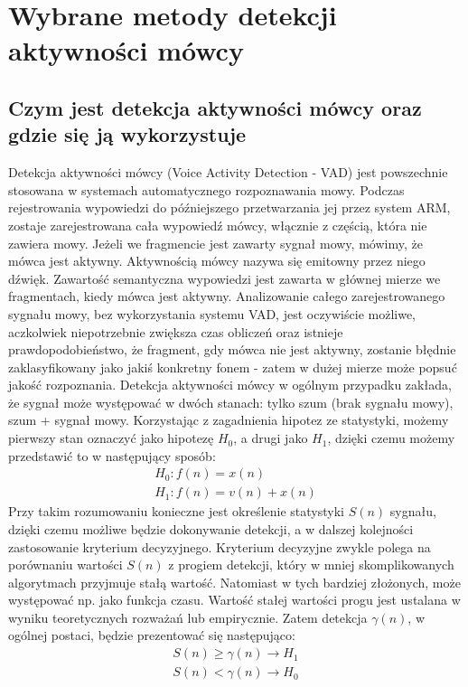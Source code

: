 \documentclass[eng,printmode]{mgr}
\begin{document}
 
\chapter{Wybrane metody detekcji aktywności mówcy}
 \section{Czym jest detekcja aktywności mówcy oraz gdzie się ją wykorzystuje}
 
 Detekcja aktywności mówcy (Voice Activity Detection - VAD) jest powszechnie stosowana w systemach automatycznego rozpoznawania mowy. Podczas rejestrowania wypowiedzi do późniejszego przetwarzania jej przez system ARM, zostaje zarejestrowana cała wypowiedź mówcy, włącznie z częścią, która nie zawiera mowy. Jeżeli we fragmencie jest zawarty sygnał mowy, mówimy, że mówca jest aktywny. Aktywnością mówcy nazywa się emitowny przez niego dźwięk.  Zawartość semantyczna wypowiedzi jest zawarta w głównej mierze we fragmentach, kiedy mówca jest aktywny. Analizowanie całego  zarejestrowanego sygnału mowy, bez wykorzystania systemu VAD, jest oczywiście możliwe, aczkolwiek niepotrzebnie zwiększa czas obliczeń oraz istnieje prawdopodobieństwo, że fragment, gdy mówca nie jest aktywny, zostanie błędnie zaklasyfikowany jako jakiś konkretny fonem - zatem w dużej mierze może popsuć jakość rozpoznania. Detekcja aktywności mówcy w ogólnym przypadku zakłada, że sygnał może występować w dwóch stanach: tylko szum (brak sygnału mowy), szum + sygnał mowy. Korzystając z zagadnienia hipotez ze statystyki, możemy pierwszy stan oznaczyć jako hipotezę $H_{0}$, a drugi jako $H_{1}$, dzięki czemu możemy przedstawić to w następujący sposób:
 \begin{equation}
  \begin{array}{c}
	  H_{0}: f(n)=x(n)\\
	  H_{1}: f(n)=v(n)+x(n)
  \end{array} 	 
 \end{equation}
  Przy takim rozumowaniu konieczne jest określenie statystyki $S(n)$ sygnału, dzięki czemu możliwe będzie dokonywanie detekcji, a w dalszej kolejności zastosowanie kryterium decyzyjnego. Kryterium decyzyjne zwykle polega na porównaniu wartości $S(n)$ z progiem detekcji, który w mniej skomplikowanych algorytmach przyjmuje stałą wartość. Natomiast w tych bardziej złożonych, może występować np. jako funkcja czasu. Wartość stałej wartości progu jest ustalana w wyniku teoretycznych rozważań lub empirycznie. Zatem detekcja $\gamma(n)$, w ogólnej postaci, będzie prezentować się następująco:
   \begin{equation}
   \begin{array}{c}
	   S(n)\geq\gamma(n)\to H_{1}\\
	   S(n)<\gamma(n)\to H_{0}
   \end{array} 	 
   \end{equation}
 
\end{document}

